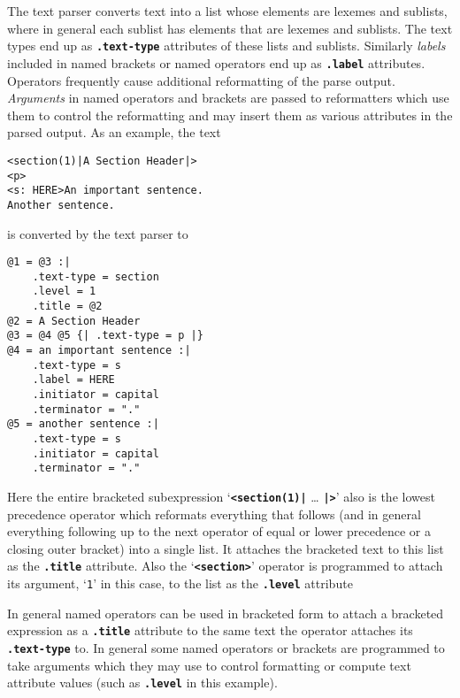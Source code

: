 \documentclass[12pt]{article}
\makeatletter
\newcommand{\TT}[1]{{\tt \bfseries #1}}
\newcommand{\ttdkey}[1]{\TT{.#1}\index{#1@{\tt .#1}}}
\newenvironment{indpar}[1][0.3in]%
	{\begin{list}{}%
		     {\setlength{\itemsep}{0in}%
		      \setlength{\topsep}{0in}%
		      \setlength{\parsep}{1ex}%
		      \setlength{\labelwidth}{#1}%
		      \setlength{\leftmargin}{#1}%
		      \addtolength{\leftmargin}{\labelsep}}%
	 \item}%
	{\end{list}}
\makeatother
\begin{document}
The text parser converts text into a list whose elements are lexemes
and sublists, where in general each sublist has elements that are
lexemes and sublists.
The text types end up as \ttdkey{text-type}
attributes of these lists and sublists.
Similarly {\em labels} included in named brackets
or named operators end up as \ttdkey{label}
attributes.  Operators frequently cause additional reformatting
of the parse output.  {\em Arguments} in named operators and
brackets are passed to reformatters which use them to control
the reformatting and may insert them as various attributes in the
parsed output.  As an example, the text

\begin{indpar}\begin{verbatim}
<section(1)|A Section Header|>
<p>
<s: HERE>An important sentence.
Another sentence.
\end{verbatim}\end{indpar}

is converted by the text parser to

\begin{indpar}\begin{verbatim}
@1 = @3 :|
    .text-type = section
    .level = 1
    .title = @2
@2 = A Section Header
@3 = @4 @5 {| .text-type = p |}
@4 = an important sentence :|
    .text-type = s
    .label = HERE
    .initiator = capital 
    .terminator = "."
@5 = another sentence :|
    .text-type = s
    .initiator = capital 
    .terminator = "."
\end{verbatim}\end{indpar}

Here the entire bracketed subexpression
`\TT{<section(1)|} \ldots{} \TT{|>}'
also is the lowest precedence operator which reformats everything that
follows (and in general everything following up to the next operator of
equal or lower precedence or a closing outer bracket) into a single list.
It attaches the bracketed text to this list as the \TT{.title} attribute.
Also the `\TT{<section>}' operator is programmed to attach its argument,
`\verb|1|' in this case, to the list as the \TT{.level} attribute

In general named operators can be used in bracketed form to attach
a bracketed expression as a \TT{.title} attribute to the same text
the operator attaches its \TT{.text-type} to.  In general some
named operators or brackets are programmed to take arguments which
they may use to control formatting or compute text attribute values
(such as \TT{.level} in this example).
\end{document}
